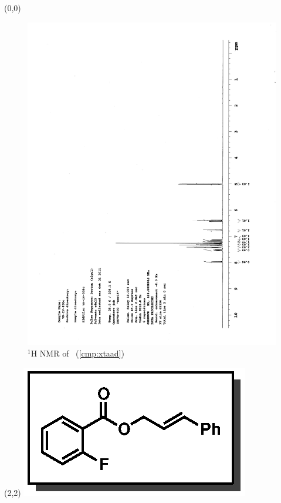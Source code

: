 \begin{textblock}{20}(0,0)
\begin{figure}[htb]
\caption{$^1$H NMR of \CMPxtaad\ (\ref{cmp:xtaad})}
\includegraphics[scale=0.75, trim = 0mm 0mm 0mm 5mm,
clip]{chp_asymmetric/images/nmr/xtaadH}
\vspace{-100pt}
\end{figure}
\end{textblock}
\begin{textblock}{1}(2,2)
\includegraphics[scale=0.8, angle=90]{chp_asymmetric/images/xtaad}
\end{textblock}
